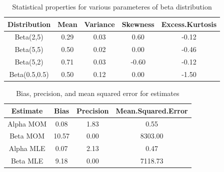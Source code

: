 \documentclass{article}\usepackage[]{graphicx}\usepackage[]{xcolor}
\begin{document}
\begin{table}[ht]
\centering
\begin{tabular}{|c|c|c|c|c|}
  \hline
Distribution & Mean & Variance & Skewness & Excess.Kurtosis \\ 
  \hline
Beta(2,5) & 0.29 & 0.03 & 0.60 & -0.12 \\ 
  Beta(5,5) & 0.50 & 0.02 & 0.00 & -0.46 \\ 
  Beta(5,2) & 0.71 & 0.03 & -0.60 & -0.12 \\ 
  Beta(0.5,0.5) & 0.50 & 0.12 & 0.00 & -1.50 \\ 
   \hline
\end{tabular}
\caption{Statistical properties for various parameteres of beta distribution} 
\label{statsProperties.tab}
\end{table}


\begin{table}[ht]
\centering
\begin{tabular}{|c|c|c|c|}
  \hline
Estimate & Bias & Precision & Mean.Squared.Error \\ 
  \hline
Alpha MOM & 0.08 & 1.83 & 0.55 \\ 
  Beta MOM & 10.57 & 0.00 & 8303.00 \\ 
  Alpha MLE & 0.07 & 2.13 & 0.47 \\ 
  Beta MLE & 9.18 & 0.00 & 7118.73 \\ 
   \hline
\end{tabular}
\caption{Bias, precision, and mean squared error for estimates} 
\label{precision.tab}
\end{table}
\end{document}
